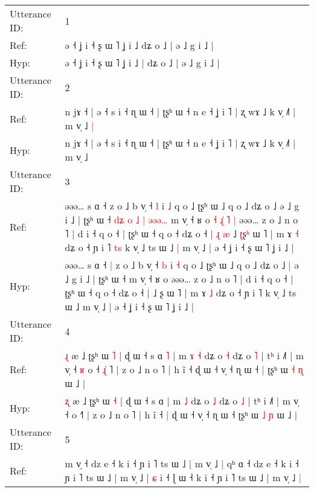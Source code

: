 \documentclass[10pt]{article}
\DeclareRobustCommand{\hl}[1]{{\textcolor{red}{#1}}}
\begin{document}
\begin{longtable}{ll}
\toprule
Utterance ID: & 1 \\
Ref: & ə ˧ ʝ i ˧ ʂ ɯ ˥ ʝ i ˩\hl{}\hl{} dʑ o ˩ | ə ˩ g i ˩ |
 \\
Hyp: & ə ˧ ʝ i ˧ ʂ ɯ ˥ ʝ i ˩\hl{ }\hl{|} dʑ o ˩ | ə ˩ g i ˩ |
 \\
\midrule
Utterance ID: & 2 \\
Ref: & n jɤ ˧ | ə ˧ s i ˧ ɳ ɯ ˧ | ʈʂʰ ɯ ˧ n e ˧ ʝ i ˥ | ʐ wɤ ˩ k v̩ ˩˥ | m v̩ ˩\hl{ }\hl{|}
 \\
Hyp: & n jɤ ˧ | ə ˧ s i ˧ ɳ ɯ ˧ | ʈʂʰ ɯ ˧ n e ˧ ʝ i ˥ | ʐ wɤ ˩ k v̩ ˩˥ | m v̩ ˩\hl{}\hl{}
 \\
\midrule
Utterance ID: & 3 \\
Ref: & əəə… s ɑ ˧\hl{}\hl{} z o ˩ b v̩ ˧ \hl{l} i \hl{˩} q o ˩ ʈʂʰ ɯ ˩ q o ˩ dʑ o ˩\hl{}\hl{} ə ˩ g i ˩ | ʈʂʰ ɯ ˧\hl{ }\hl{d}\hl{ʑ}\hl{ }\hl{o}\hl{ }\hl{˩}\hl{ }\hl{|}\hl{ }\hl{ə}\hl{ə}\hl{ə}\hl{…} m v̩ ˧ ʁ o\hl{ }\hl{˧}\hl{ }\hl{ɻ}\hl{̍}\hl{ }\hl{˥}\hl{ }\hl{|} əəə… z o ˩ n o ˥ | d i ˧ q o ˧ | ʈʂʰ ɯ ˧ q o ˧ dʑ o ˧ |\hl{ }\hl{ɻ}\hl{ }\hl{æ} ˩ \hl{ʈ}ʂ\hl{ʰ} ɯ ˥ | m ɤ \hl{˧} dʑ o ˧ ɲ i ˥\hl{ }\hl{t}\hl{s} k v̩ ˩ ts ɯ ˩\hl{ }\hl{|} m v̩ ˩ | ə ˧ ʝ i ˧ ʂ ɯ ˥ ʝ i ˩ |
 \\
Hyp: & əəə… s ɑ ˧\hl{ }\hl{|} z o ˩ b v̩ ˧ \hl{b} i \hl{˧} q o ˩ ʈʂʰ ɯ ˩ q o ˩ dʑ o ˩\hl{ }\hl{|} ə ˩ g i ˩ | ʈʂʰ ɯ ˧\hl{}\hl{}\hl{}\hl{}\hl{}\hl{}\hl{}\hl{}\hl{}\hl{}\hl{}\hl{}\hl{}\hl{} m v̩ ˧ ʁ o\hl{}\hl{}\hl{}\hl{}\hl{}\hl{}\hl{}\hl{}\hl{} əəə… z o ˩ n o ˥ | d i ˧ q o ˧ | ʈʂʰ ɯ ˧ q o ˧ dʑ o ˧ |\hl{}\hl{}\hl{}\hl{} ˩ \hl{}ʂ\hl{} ɯ ˥ | m ɤ \hl{˩} dʑ o ˧ ɲ i ˥\hl{}\hl{}\hl{} k v̩ ˩ ts ɯ ˩\hl{}\hl{} m v̩ ˩ | ə ˧ ʝ i ˧ ʂ ɯ ˥ ʝ i ˩ |
 \\
\midrule
Utterance ID: & 4 \\
Ref: & \hl{ɻ} æ ˩ ʈʂʰ ɯ \hl{˥} | ɖ ɯ ˧ s ɑ\hl{ }\hl{˥} | m\hl{ }\hl{ɤ} \hl{˧} dʑ o \hl{˧} dʑ o \hl{˥} | tʰ i ˩˥ | m v̩ ˧\hl{ }\hl{ʁ} o ˧\hl{ }\hl{ɻ}\hl{̍}\hl{ }˥ | z o ˩ n o ˥ | h ĩ ˧\hl{}\hl{} ɖ ɯ ˧ v̩ ˧ ɳ ɯ ˧\hl{ }\hl{|} ʈʂʰ ɯ \hl{˧} \hl{ɳ} ɯ ˩ |
 \\
Hyp: & \hl{ʐ} æ ˩ ʈʂʰ ɯ \hl{˧} | ɖ ɯ ˧ s ɑ\hl{}\hl{} | m\hl{}\hl{} \hl{˩} dʑ o \hl{˩} dʑ o \hl{˩} | tʰ i ˩˥ | m v̩ ˧\hl{}\hl{} o ˧\hl{}\hl{}\hl{}\hl{}˥ | z o ˩ n o ˥ | h ĩ ˧\hl{ }\hl{|} ɖ ɯ ˧ v̩ ˧ ɳ ɯ ˧\hl{}\hl{} ʈʂʰ ɯ \hl{˩} \hl{ɲ} ɯ ˩ |
 \\
\midrule
Utterance ID: & 5 \\
Ref: & m v̩ ˧ dz e ˧ k i ˧ ɲ i ˥ ts ɯ ˩ | m v̩ ˩\hl{ }\hl{|} qʰ ɑ ˧ dz e ˧ k i ˧ ɲ i ˥ ts ɯ ˩ | m v̩ ˩ | \hl{ɕ} i ˧ ɭ ɯ ˧ k i ˧ ɲ i ˥ ts ɯ ˩ | m v̩ ˩\hl{ }\hl{|}

\end{longtable}
\end{document}
